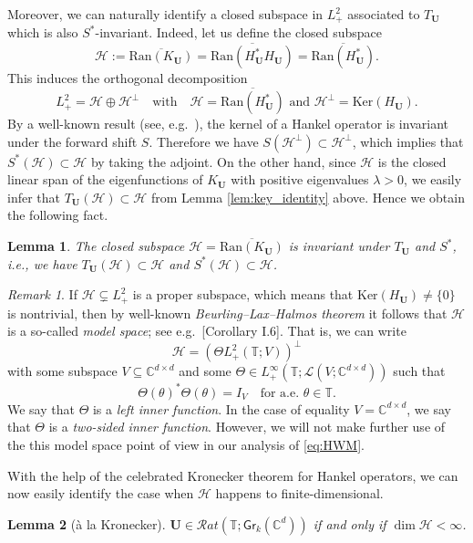 \documentclass[10pt,reqno,a4paper]{amsart}
\newtheorem{lem}{Lemma}[section]
\theoremstyle{definition}
\theoremstyle{remark}
\theoremstyle{remark}
\newtheorem*{remark*}{Remark}
\numberwithin{equation}{section}
\newcommand{\C}{\mathbb{C}}
\newcommand{\T}{\mathbb{T}}
\newcommand{\ov}{\overline}
\newcommand{\ran}{\mathrm{Ran}}
\renewcommand{\ker}{\mathrm{Ker}}
\newcommand{\Ub}{\mathbf{U}}
\newcommand{\id}{I}
\newcommand{\Gr}{\mathsf{Gr}}
\newcommand{\Hs}{\mathscr{H}}
\newcommand{\Ls}{\mathscr{L}}
\begin{document}
Moreover, we can naturally identify a closed subspace in $L^2_+$ associated to $T_\Ub$ which is also $S^*$-invariant. Indeed, let us define the closed subspace
$$
\Hs := \ov{\ran(K_\Ub)} = \ov{\ran(H^*_\Ub H_\Ub)} = \ov{\ran(H^*_\Ub)}.
$$
This induces the orthogonal decomposition
$$
L^2_+ = \Hs \oplus \Hs^\perp \quad \mbox{with} \quad \mbox{$\Hs = \ov{\ran(H^*_\Ub)}$ and $\Hs^\perp = \ker(H_\Ub)$}.
$$
By a well-known result  (see, e.g.~\cite{Pe-03}), the kernel of a Hankel operator is invariant under the forward shift $S$. Therefore we have  $S (\Hs^\perp) \subset \Hs^\perp$, which implies that $S^*(\Hs) \subset \Hs$ by taking the adjoint. On the other hand, since $\Hs$ is the closed linear span of the eigenfunctions of $K_\Ub$ with positive eigenvalues $\lambda >0$, we easily infer that $T_\Ub(\Hs) \subset \Hs$ from Lemma \ref{lem:key_identity} above. Hence we obtain the following fact.

\begin{lem}
The closed subspace $\Hs = \ov{\ran(K_\Ub)}$ is invariant under $T_\Ub$ and $S^*$, i.e., we have $T_{\Ub}(\Hs) \subset \Hs$ and $S^*(\Hs) \subset \Hs$.
\end{lem}

\begin{remark*}
If $\Hs \subsetneq L^2_+$ is a proper subspace, which means that $\ker(H_\Ub) \neq \{ 0 \}$ is nontrivial, then by well-known {\em Beurling--Lax--Halmos theorem} it follows that $\Hs$ is a so-called {\em model space}; see e.g.~\cite{Ni-86}[Corollary I.6]. That is, we can write
$$
\Hs = (\Theta L^2_+(\T; V))^\perp
$$
with some subspace $V \subseteq \C^{d \times d}$ and some $\Theta \in L^\infty_+(\T; \Ls(V; \C^{d \times d}))$ such that 
$$
\Theta(\theta)^* \Theta(\theta) = \id_{V} \quad \mbox{for a.e.~$\theta \in \T$}.
$$ 
We say that $\Theta$ is a {\em left inner function}. In the case of equality $V = \C^{d \times d}$, we say that $\Theta$ is a {\em two-sided inner function}. However, we will not make further use of the this model space point of view in our analysis of \eqref{eq:HWM}.
\end{remark*}

With the help of the celebrated Kronecker theorem for Hankel operators, we can now easily identify the case when $\Hs$ happens to finite-dimensional. 

\begin{lem}[\`a la Kronecker] \label{lem:kronecker}
$\Ub \in \mathcal{R}at(\T; \Gr_k(\C^d))$ if and only if $\dim \Hs < \infty$.
\end{lem}
\end{document}
